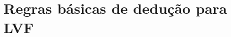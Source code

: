 \fi


\label{ProofRules}
\newpage\section{Regras básicas de dedução para LVF}

\newlength{\mathemwd}
\def\mathem{{\hbox to\mathemwd{}}}


